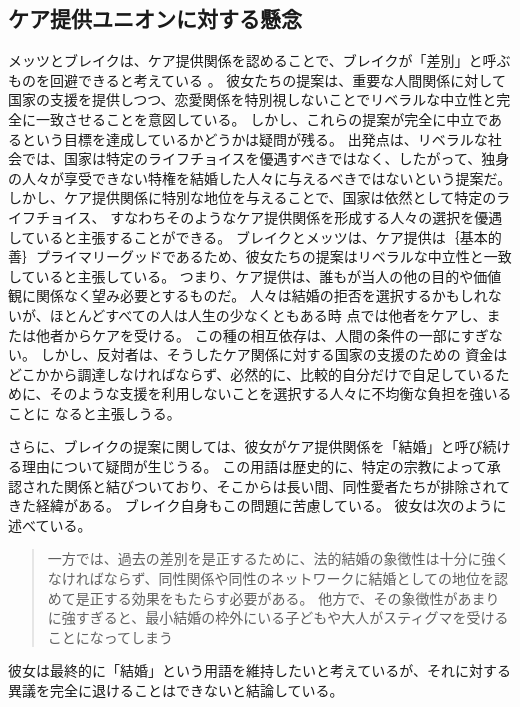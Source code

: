 \documentclass[paper=a4,book,openany]{jlreq}
\begin{document}
\subsection{ケア提供ユニオンに対する懸念}

メッツとブレイクは、ケア提供関係を認めることで、ブレイクが「差別」と呼ぶものを回避できると考えている
\citep[p.89]{brake12:_minim_marriag}。
彼女たちの提案は、重要な人間関係に対して国家の支援を提供しつつ、恋愛関係を特別視しないことでリベラルな中立性と完全に一致させることを意図している。
しかし、これらの提案が完全に中立であるという目標を達成しているかどうかは疑問が残る。
出発点は、リベラルな社会では、国家は特定のライフチョイスを優遇すべきではなく、したがって、独身の人々が享受できない特権を結婚した人々に与えるべきではないという提案だ。
しかし、ケア提供関係に特別な地位を与えることで、国家は依然として特定のライフチョイス、
すなわちそのようなケア提供関係を形成する人々の選択を優遇していると主張することができる。
ブレイクとメッツは、ケア提供は｛基本的善｝{プライマリーグッド}であるため、彼女たちの提案はリベラルな中立性と一致していると主張している。
つまり、ケア提供は、誰もが当人の他の目的や価値観に関係なく望み必要とするものだ。
人々は結婚の拒否を選択するかもしれないが、ほとんどすべての人は人生の少なくともある時
点では他者をケアし、または他者からケアを受ける。
この種の相互依存は、人間の条件の一部にすぎない。
しかし、反対者は、そうしたケア関係に対する国家の支援のための
資金はどこかから調達しなければならず、必然的に、比較的自分だけで自足しているた
めに、そのような支援を利用しないことを選択する人々に不均衡な負担を強いることに
なると主張しうる。

さらに、ブレイクの提案に関しては、彼女がケア提供関係を「結婚」と呼び続ける理由について疑問が生じうる。
この用語は歴史的に、特定の宗教によって承認された関係と結びついており、そこからは長い間、同性愛者たちが排除されてきた経緯がある。
ブレイク自身もこの問題に苦慮している。
彼女は次のように述べている。

\begin{quote}
一方では、過去の差別を是正するために、法的結婚の象徴性は十分に強くなければならず、同性関係や同性のネットワークに結婚としての地位を認めて是正する効果をもたらす必要がある。
他方で、その象徴性があまりに強すぎると、最小結婚の枠外にいる子どもや大人がスティグマを受けることになってしまう\citep[p.187]{brake12:_minim_marriag}
\end{quote}

彼女は最終的に「結婚」という用語を維持したいと考えているが、それに対する異議を完全に退けることはできないと結論している。
\end{document}
